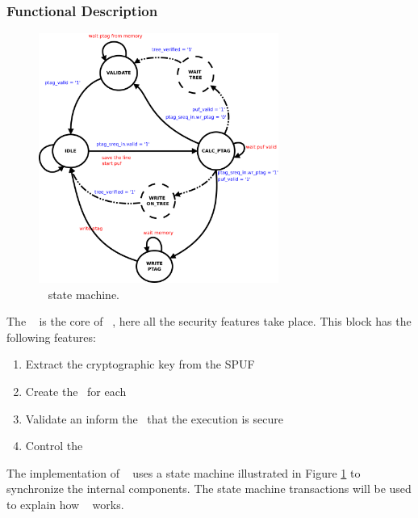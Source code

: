 \subsubsection{Functional Description}

\begin{figure}[!ht]
    \centering
    \includegraphics[width=0.70\textwidth]{figures/pdf/sec_engine_sm.pdf}
    \caption{\seceng~ state  machine. }
    \label{fig:sesm}
\end{figure}

The \seceng~ is the core of \cshia~, here all the security features take place. This block has the following features: 
\begin{enumerate}
    \item Extract the cryptographic key from the SPUF
    \item Create the \ptags~for each \sline
    \item Validate \ptags an inform the \handler~that the execution is secure
    \item Control the \ptagmem~ 
\end{enumerate}
 The implementation of \seceng~ uses a state machine illustrated in Figure \ref{fig:sesm} to synchronize the internal components. The state machine transactions will be used to explain how \seceng~ works.


